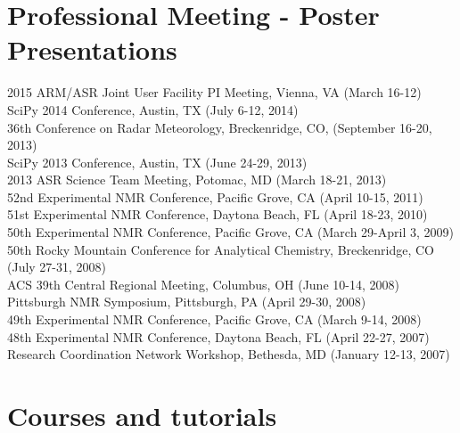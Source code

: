 \documentclass[margin,line]{res}
\begin{document}
\begin{resume}
\section{\sc Professional Meeting - Poster Presentations}
2015 ARM/ASR Joint User Facility PI Meeting, Vienna, VA (March 16-12)\\
SciPy 2014 Conference, Austin, TX (July 6-12, 2014)\\
36th Conference on Radar Meteorology, Breckenridge, CO, (September 16-20, 2013)\\
SciPy 2013 Conference, Austin, TX (June 24-29, 2013)\\
2013 ASR Science Team Meeting, Potomac, MD (March 18-21, 2013)\\
52nd Experimental NMR Conference, Pacific Grove, CA (April 10-15, 2011) \\
51st Experimental NMR Conference, Daytona Beach, FL (April 18-23, 2010)\\
50th Experimental NMR Conference, Pacific Grove, CA (March 29-April 3, 2009)\\
50th Rocky Mountain Conference for Analytical Chemistry, Breckenridge, CO (July 27-31, 2008)\\
ACS 39th Central Regional Meeting, Columbus, OH (June 10-14, 2008)\\
Pittsburgh NMR Symposium, Pittsburgh, PA (April 29-30, 2008)\\
49th Experimental NMR Conference, Pacific Grove, CA (March 9-14, 2008)\\
48th Experimental NMR Conference, Daytona Beach, FL (April 22-27, 2007)\\
Research Coordination Network Workshop, Bethesda, MD (January 12-13, 2007)\\


\vspace{-0.1in}
\section{\sc Courses and tutorials}


\end{resume}
\end{document}
